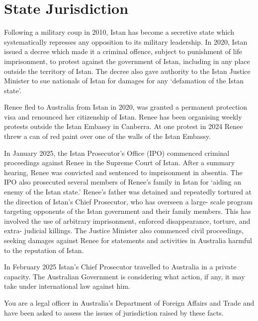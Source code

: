 \section{State Jurisdiction}
\begin{tutorialquestion}
    \flushleft
    Following a military coup in 2010, Istan has become a secretive state which systematically represses any opposition to its military leadership. In 2020, Istan issued a decree which made it a criminal offence, subject to punishment of life imprisonment, to protest against the government of Istan, including in any place outside the territory of Istan. The decree also gave authority to the Istan Justice Minister to sue nationals of Istan for damages for any `defamation of the Istan state'.
    
    \vspace{\baselineskip}
    
    Renee fled to Australia from Istan in 2020, was granted a permanent protection visa and renounced her citizenship of Istan. Renee has been organising weekly protests outside the Istan Embassy in Canberra. At one protest in 2024 Renee threw a can of red paint over one of the walls of the Istan Embassy.

    \vspace{\baselineskip}

    In January 2025, the Istan Prosecutor's Office (IPO) commenced criminal proceedings against Renee in the Supreme Court of Istan. After a summary hearing, Renee was convicted and sentenced to imprisonment in absentia. The IPO also prosecuted several members of Renee's family in Istan for `aiding an enemy of the Istan state.' Renee's father was detained and repeatedly tortured at the direction of Istan's Chief Prosecutor, who has overseen a large- scale program targeting opponents of the Istan government and their family members. This has involved the use of arbitrary imprisonment, enforced disappearance, torture, and extra- judicial killings. The Justice Minister also commenced civil proceedings, seeking damages against Renee for statements and activities in Australia harmful to the reputation of Istan.

    \vspace{\baselineskip}

    In February 2025 Istan's Chief Prosecutor travelled to Australia in a private capacity. The Australian Government is considering what action, if any, it may take under international law against him.

    \vspace{\baselineskip}

    You are a legal officer in Australia's Department of Foreign Affairs and Trade and have been asked to assess the issues of jurisdiction raised by these facts.
\end{tutorialquestion}

